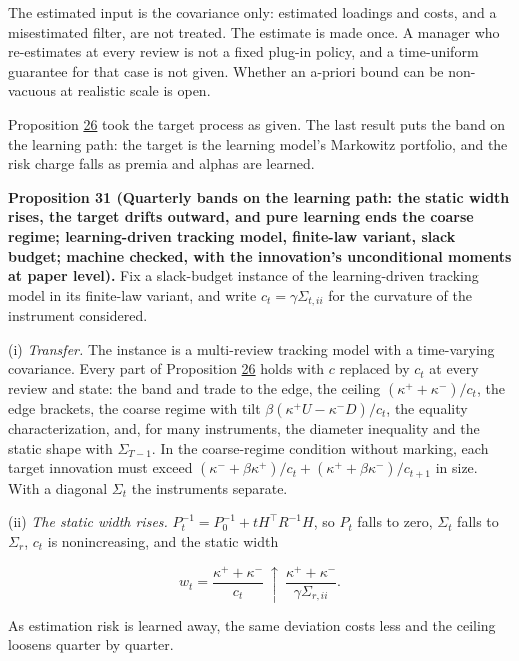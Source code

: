 \documentclass[11pt]{article}
\begin{document}
The estimated input is the covariance only: estimated loadings and
costs, and a misestimated filter, are not treated. The estimate is
made once. A manager who re-estimates at every review is not a fixed
plug-in policy, and a time-uniform guarantee for that case is not
given. Whether an a-priori bound can be non-vacuous at realistic
scale is open.

Proposition \hyperref[res:Proposition-26]{26} took the target process as given. The last result
puts the band on the learning path: the target is the learning
model's Markowitz portfolio, and the risk charge falls as premia and
alphas are learned.

\label{res:Proposition-31}
\textbf{Proposition 31 (Quarterly bands on the learning path: the static width rises, the target drifts outward, and pure learning ends the coarse regime; learning-driven tracking model, finite-law variant, slack budget; machine checked, with the innovation's unconditional moments at paper level).}
Fix a slack-budget instance of the learning-driven tracking model in
its finite-law variant, and write \(c_t=\gamma\Sigma_{t,ii}\) for the
curvature of the instrument considered.

(i) \emph{Transfer.} The instance is a multi-review tracking model with a
time-varying covariance. Every part of Proposition \hyperref[res:Proposition-26]{26} holds with
\(c\) replaced by \(c_t\) at every review and state: the band and trade to
the edge, the ceiling \((\kappa^++\kappa^-)/c_t\), the edge brackets, the coarse
regime with tilt \(\beta(\kappa^+U-\kappa^-D)/c_t\), the equality
characterization, and, for many instruments, the diameter inequality
and the static shape with \(\Sigma_{T-1}\). In the coarse-regime condition
without marking, each target innovation must exceed
\((\kappa^-+\beta\kappa^+)/c_t+(\kappa^++\beta\kappa^-)/c_{t+1}\) in size. With a
diagonal \(\Sigma_t\) the instruments separate.

(ii) \emph{The static width rises.} \(P_t^{-1}=P_0^{-1}+tH^\top R^{-1}H\), so
\(P_t\) falls to zero, \(\Sigma_t\) falls to \(\Sigma_r\), \(c_t\) is nonincreasing,
and the static width

\begin{equation*}
w_t=\frac{\kappa^++\kappa^-}{c_t}\ \uparrow\ \frac{\kappa^++\kappa^-}{\gamma\Sigma_{r,ii}}.\tag{96}\label{eq:96}
\end{equation*}

As estimation risk is learned away, the same deviation costs less and
the ceiling loosens quarter by quarter.
\end{document}
